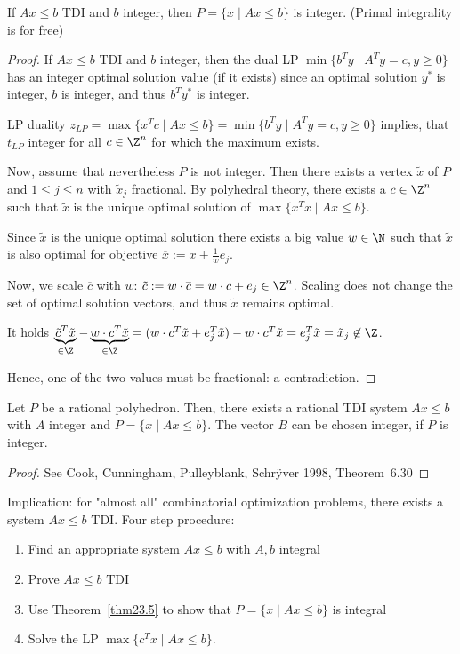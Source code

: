 \begin{thm}\label{thm23.5}
If $A x \leq b$ TDI and $b$ integer, then $P = \{ x \mid Ax \leq b \}$ is
integer. (Primal integrality is for free)
\end{thm}
\begin{proof}
If $Ax \leq b$ TDI and $b$ integer, then the dual LP $\min \{ b^Ty \mid A^Ty
= c, y \geq 0 \}$ has an integer optimal solution value (if it exists) since
an optimal solution $y^*$ is integer, $b$ is integer, and thus $b^T y^*$ is integer.

LP duality $z_{LP} = \max\{ x^Tc \mid Ax \leq b \} = \min\{ b^Ty \mid
A^Ty=c, y \geq 0 \}$ implies, that $t_{LP}$ integer for all $c \in \Z^n$ for
which the maximum exists.

Now, assume that nevertheless $P$ is not integer. Then there exists a vertex
$\tilde{x}$ of $P$ and $1 \leq j \leq n$ with $\tilde{x}_j$ fractional.
By polyhedral theory, there exists a $c \in \Z^n$ such that $\tilde{x}$ is
the unique optimal solution of $\max \{ x^Tx \mid Ax \leq b \}$.

Since $\tilde{x}$ is the unique optimal solution there exists a big value
$w \in \N$ such that $\tilde{x}$ is also optimal for objective
$\overline{x} := x + \frac{1}{w} e_j$.

Now, we scale $\overline{c}$ with
$w$: $\tilde{c} := w \cdot \overline{c} = w \cdot c + e_j \in \Z^n$.
Scaling does not change the set of optimal solution vectors, and thus
$\tilde{x}$ remains optimal.

It holds $\underbrace{\tilde{c}^T \tilde{x}}_{\in \Z} - \underbrace{w \cdot c^T
\tilde{x}}_{\in \Z} = (w \cdot c^T \tilde{x} + e_j^T \tilde{x}) - w \cdot
c^T \tilde{x} = e_j^T \tilde{x} = \tilde{x}_j \not\in \Z$.

Hence, one of the two values must be fractional: a contradiction.
\end{proof}

\begin{thm}\label{thm23.6}
Let $P$ be a rational polyhedron. Then, there exists a rational TDI system
$A x \leq b$ with $A$ integer and $P = \{ x \mid Ax \leq b \}$. The vector
$B$ can be chosen integer, if $P$ is integer.
\end{thm}
\begin{proof}
See Cook, Cunningham, Pulleyblank, Schr\"yver 1998, Theorem~6.30
\end{proof}

Implication:
for "almost all" combinatorial optimization problems, there exists a system
$A x \leq b$ TDI. Four step procedure:
\begin{enumerate}[1)]
\item Find an appropriate system $A x \leq b$ with $A, b$ integral
\item Prove $A x \leq b$ TDI
\item Use Theorem~\ref{thm23.5} to show that $P = \{ x \mid Ax \leq b \}$ is
integral
\item Solve the LP $\max \{ c^Tx \mid Ax \leq b \}$.
\end{enumerate}


